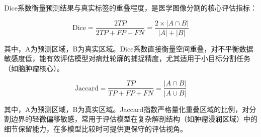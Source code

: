 Dice系数衡量预测结果与真实标签的重叠程度，是医学图像分割的核心评估指标：

\begin{equation}
    \mathrm{Dice}=\frac{2 T P}{2 T P+F P+F N}=\frac{2 \times|A \cap B|}{|A|+|B|}
\end{equation}

其中，A为预测区域，B为真实区域。Dice系数直接衡量空间重叠，对不平衡数据敏感度低，能有效评估模型对病灶轮廓的捕捉精度，尤其适用于小目标分割任务（如脑肿瘤核心）。

\begin{equation}
    \mathrm{Jaccard}=\frac{T P}{T P+F P+F N}=\frac{|A \cap B|}{|A \cup B|}
\end{equation}

其中，A为预测区域，B为真实区域。Jaccard指数严格量化重叠区域的比例，对分割边界的轻微偏移敏感，常用于评估模型在复杂解剖结构（如肿瘤浸润区域）中的细节保留能力，在多模型比较时可提供更保守的评估视角。